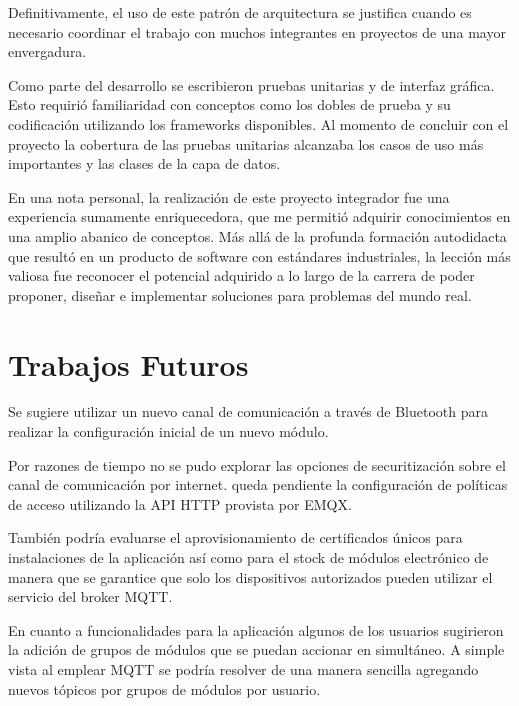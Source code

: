 Definitivamente, el uso de este patrón de arquitectura se justifica cuando es necesario coordinar el trabajo con muchos integrantes en proyectos de una mayor envergadura.

Como parte del desarrollo se escribieron pruebas unitarias y de interfaz gráfica. Esto requirió familiaridad con conceptos como los dobles de prueba y su codificación utilizando los frameworks disponibles. Al momento de concluir con el proyecto la cobertura de las pruebas unitarias alcanzaba los casos de uso más importantes y las clases de la capa de datos.

En una nota personal, la realización de este proyecto integrador fue una experiencia sumamente enriquecedora, que me permitió adquirir conocimientos en una amplio abanico de conceptos. Más allá de la profunda formación autodidacta que resultó en un producto de software con estándares industriales, la lección más valiosa fue reconocer el potencial adquirido a lo largo de la carrera de poder proponer, diseñar e implementar soluciones para problemas del mundo real.

\section{Trabajos Futuros}
Se sugiere utilizar un nuevo canal de comunicación a través de Bluetooth para realizar la configuración inicial de un nuevo módulo.

Por razones de tiempo no se pudo explorar las opciones de securitización sobre el canal de comunicación por internet. 
queda pendiente la configuración de políticas de acceso utilizando la API HTTP provista por EMQX.

También podría evaluarse el aprovisionamiento de certificados únicos para instalaciones de la aplicación así como para el stock de módulos electrónico
de manera que se garantice que solo los dispositivos autorizados pueden utilizar el servicio del broker MQTT.

En cuanto a funcionalidades para la aplicación algunos de los usuarios sugirieron la adición de grupos de módulos que se puedan accionar en simultáneo.
A simple vista al emplear MQTT se podría resolver de una manera sencilla agregando nuevos tópicos por grupos de módulos por usuario.



